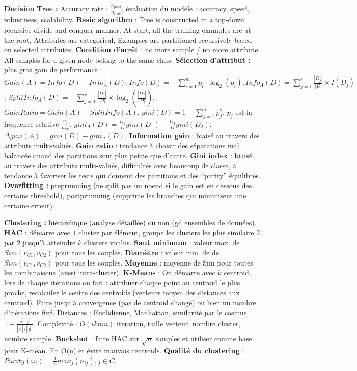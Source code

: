 \documentclass[9pt,a4paper]{report}
\begin{document}
\textbf{Decision Tree :} Accuracy rate : $\frac{n_{pred}}{n_{true}}$, évaluation du modèle : accuracy, speed, robustness, scalability. \textbf{Basic algorithm} : Tree is constructed in a top-down recursive divide-and-conquer manner, At start, all the training examples are at the root, Attributes are categorical, Examples are partitioned recursively based on selected attributes. \textbf{Condition d'arrêt} : no more sample / no more attribute. All samples for a given node belong to the same class. \textbf{Sélection d'attribut :} plus gros gain de performance : $Gain(A)=Info(D)-Info_A(D), Info(D)=-\sum_{i=1}^mp_i\cdot\log_2(p_i), Info_A(D)=\sum_{j=1}^v\frac{|D_j|}{|D|}\times I(D_j)$. $SplitInfo_A(D)=-\sum_{j=1}^v\frac{|D_j|}{|D|}\times\log_2(\frac{|D_j|}{|D|})$. $GainRatio = Gain(A)-SplitInfo(A)$. $gini(D)=1-\sum_{j=1}^np^2_j$, $p_j$ est la fréquence relative $\frac{n_j}{n_{tot}}$. $gini_A(D)=\frac{D_1}{D}gini(D_1)+\frac{D_2}{D}gini(D_2)$. $\Delta gini(A)=gini(D)-gini_A(D)$.
\textbf{Information gain} : biaisé au travers des attributs multi-valués.
\textbf{Gain ratio} : tendance à choisir des séparations mal balancée quand des partitions sont plus petite que d’autre.
\textbf{Gini index} : biaisé au travers des attributs multi-valués, difficultés avec beaucoup de classe, à tendance à favoriser les tests qui donnent des partitions et des “purity” équilibrés.
\textbf{Overfitting :} preprunming (ne split pas un noeud si le gain est en dessous des certains threshold), postprumning (supprime les branches qui minimisent une certaine erreur).

\textbf{Clustering :} hiérarchique (analyse détaillée) ou non (gd ensembles de données). \textbf{HAC} : démarre avec $1$ cluster par élément, groupe les clusters les plus similaire $2$ par $2$ jusqu'à atteindre $k$ clusters voulus. \textbf{Saut minimum} : valeur max. de $Sim(v_{C1}, v_{C2})$ pour tous les couples. \textbf{Diamètre} : valeur min. de de $Sim(v_{C1}, v_{C2})$ pour tous les couples. \textbf{Moyenne} :  moyenne de Sim pour toutes les combinaisons (aussi intra-cluster). \textbf{K-Means} : On démarre avec $k$ centroid, lors de chaque itérations on fait : attribuer chaque point au centroid le plus proche, recalculer le centre des centroids (vecteurs moyen des distances aux centroid). Faire jusqu'à convergence (pas de centroid changé) ou bien un nombre d'itérations fixé. Distances : Euclidienne, Manhattan, similarité par le cosinus $1-\frac{\vec{x}\cdot\vec{y}}{|\vec{x}|\cdot|\vec{y}|}$. Complexité : $O(iknm)$ iteration, taille vecteur, nombre cluster, nombre sample. \textbf{Buckshot} : faire HAC sur $\sqrt{n}$ samples et utiliser comme base pour K-mean. En O(n) et évite mauvais centroids. \textbf{Qualité du clustering} : $Purity(\omega_i)=\frac{1}{n}max_j(n_{ij}), j\in C$.
\end{document}
